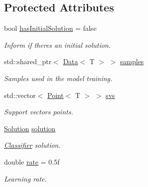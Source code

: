 \subsection*{Protected Attributes}
\begin{DoxyCompactItemize}
\item 
\mbox{\label{class_classifier_a914e488b477b9237cf991ff0b485c6c7}} 
bool \hyperlink{class_classifier_a914e488b477b9237cf991ff0b485c6c7}{has\+Initial\+Solution} = false
\begin{DoxyCompactList}\small\item\em Inform if there\textquotesingle{}s an initial solution. \end{DoxyCompactList}\item 
\mbox{\label{class_classifier_a0000b47a2e0784ada4c52d7046c4adb8}} 
std\+::shared\+\_\+ptr$<$ \hyperlink{class_data}{Data}$<$ T $>$ $>$ \hyperlink{class_classifier_a0000b47a2e0784ada4c52d7046c4adb8}{samples}
\begin{DoxyCompactList}\small\item\em Samples used in the model training. \end{DoxyCompactList}\item 
\mbox{\label{class_classifier_ae8695222e93f7fea1a1e585d4c126f7d}} 
std\+::vector$<$ \hyperlink{class_point}{Point}$<$ T $>$ $>$ \hyperlink{class_classifier_ae8695222e93f7fea1a1e585d4c126f7d}{svs}
\begin{DoxyCompactList}\small\item\em Support vectors points. \end{DoxyCompactList}\item 
\mbox{\label{class_classifier_adecdc97505c2911a66e240ad0fefd9ea}} 
\hyperlink{class_solution}{Solution} \hyperlink{class_classifier_adecdc97505c2911a66e240ad0fefd9ea}{solution}
\begin{DoxyCompactList}\small\item\em \hyperlink{class_classifier}{Classifier} solution. \end{DoxyCompactList}\item 
\mbox{\label{class_classifier_a7b1c4ef87631bd9e46682e5bc4315111}} 
double \hyperlink{class_classifier_a7b1c4ef87631bd9e46682e5bc4315111}{rate} = 0.\+5f
\begin{DoxyCompactList}\small\item\em Learning rate. \end{DoxyCompactList}\item 

\end{DoxyCompactItemize}
